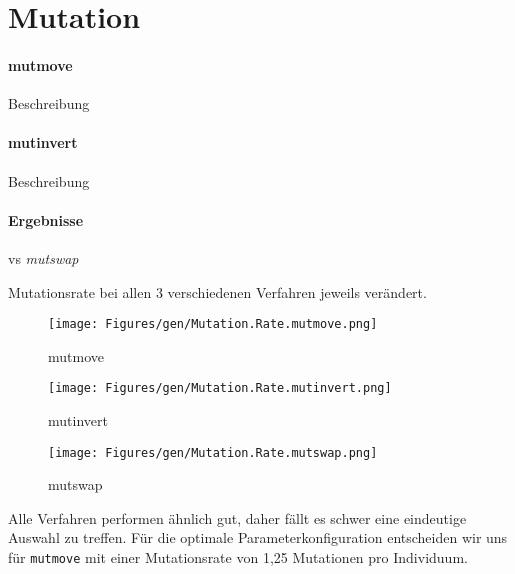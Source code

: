 \section{Mutation}\label{mutation}


\paragraph{mutmove}
Beschreibung

\paragraph{mutinvert}
Beschreibung

\paragraph{Ergebnisse}
vs \emph{mutswap}

Mutationsrate bei allen 3 verschiedenen Verfahren jeweils verändert.









\begin{figure}[!h]
  \texttt{[image: Figures/gen/Mutation.Rate.mutmove.png]}
  \caption{mutmove}\label{fig:mutmove}
\endminipage\hfill
{}
  \texttt{[image: Figures/gen/Mutation.Rate.mutinvert.png]}
  \caption{mutinvert}\label{fig:mutinvert}
\endminipage\hfill
{}%
  \texttt{[image: Figures/gen/Mutation.Rate.mutswap.png]}
  \caption{mutswap}\label{fig:mutswap}
\endminipage
\end{figure}

Alle Verfahren performen ähnlich gut, daher fällt es schwer eine eindeutige
Auswahl zu treffen.
Für die optimale Parameterkonfiguration entscheiden wir uns für
{\tt mutmove} mit einer Mutationsrate von 1,25 Mutationen pro Individuum.
